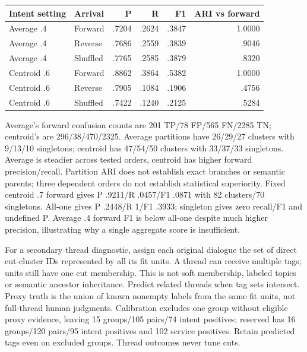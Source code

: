 \documentclass[11pt]{article}
\begin{document}
\begin{center}
\begin{tabular}{llrrrr}
\toprule
Intent setting & Arrival & P & R & F1 & ARI vs forward \\
\midrule
Average .4 & Forward & .7204 & .2624 & .3847 & 1.0000 \\
Average .4 & Reverse & .7686 & .2559 & .3839 & .9046 \\
Average .4 & Shuffled & .7765 & .2585 & .3879 & .8320 \\
Centroid .6 & Forward & .8862 & .3864 & .5382 & 1.0000 \\
Centroid .6 & Reverse & .7905 & .1084 & .1906 & .4756 \\
Centroid .6 & Shuffled & .7422 & .1240 & .2125 & .5284 \\
\bottomrule
\end{tabular}
\end{center}
Average's forward confusion counts are 201 TP/78 FP/565 FN/2285 TN; centroid's
are 296/38/470/2325. Average partitions have 26/29/27 clusters with 9/13/10
singletons; centroid has 47/54/50 clusters with 33/37/33 singletons. Average is
steadier across tested orders, centroid has higher forward precision/recall.
Partition ARI does not establish exact branches or semantic parents; three
dependent orders do not establish statistical superiority. Fixed centroid .7
forward gives P .9211/R .0457/F1 .0871 with 82 clusters/70 singletons. All-one
gives P .2448/R 1/F1 .3933; singleton gives zero recall/F1 and undefined P.
Average .4 forward F1 is below all-one despite much higher precision, illustrating
why a single aggregate score is insufficient.

For a secondary thread diagnostic, assign each original dialogue the set of
direct cut-cluster IDs represented by all its fit units. A thread can receive
multiple tags; units still have one cut membership. This is not soft membership,
labeled topics or semantic ancestor inheritance. Predict related threads when
tag sets intersect. Proxy truth is the union of known nonempty labels from the
same fit units, not full-thread human judgments. Calibration excludes one group
without eligible proxy evidence, leaving 15 groups/105 pairs/74 intent positives;
reserved has 16 groups/120 pairs/95 intent positives and 102 service positives.
Retain predicted tags even on excluded groups. Thread outcomes never tune cuts.
\end{document}
